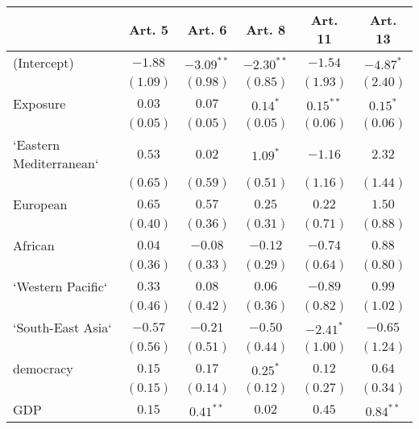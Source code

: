 
\begin{table}[!h]
\begin{center}
\begin{tabular}{l c c c c c }
\toprule
 & Art. 5 & Art. 6 & Art. 8 & Art. 11 & Art. 13 \\
\midrule
(Intercept)             & $-1.88$      & $-3.09^{**}$ & $-2.30^{**}$ & $-1.54$      & $-4.87^{*}$  \\
                        & $(1.09)$     & $(0.98)$     & $(0.85)$     & $(1.93)$     & $(2.40)$     \\
Exposure                & $0.03$       & $0.07$       & $0.14^{*}$   & $0.15^{**}$  & $0.15^{*}$   \\
                        & $(0.05)$     & $(0.05)$     & $(0.05)$     & $(0.06)$     & $(0.06)$     \\
`Eastern Mediterranean` & $0.53$       & $0.02$       & $1.09^{*}$   & $-1.16$      & $2.32$       \\
                        & $(0.65)$     & $(0.59)$     & $(0.51)$     & $(1.16)$     & $(1.44)$     \\
European                & $0.65$       & $0.57$       & $0.25$       & $0.22$       & $1.50$       \\
                        & $(0.40)$     & $(0.36)$     & $(0.31)$     & $(0.71)$     & $(0.88)$     \\
African                 & $0.04$       & $-0.08$      & $-0.12$      & $-0.74$      & $0.88$       \\
                        & $(0.36)$     & $(0.33)$     & $(0.29)$     & $(0.64)$     & $(0.80)$     \\
`Western Pacific`       & $0.33$       & $0.08$       & $0.06$       & $-0.89$      & $0.99$       \\
                        & $(0.46)$     & $(0.42)$     & $(0.36)$     & $(0.82)$     & $(1.02)$     \\
`South-East Asia`       & $-0.57$      & $-0.21$      & $-0.50$      & $-2.41^{*}$  & $-0.65$      \\
                        & $(0.56)$     & $(0.51)$     & $(0.44)$     & $(1.00)$     & $(1.24)$     \\
democracy               & $0.15$       & $0.17$       & $0.25^{*}$   & $0.12$       & $0.64$       \\
                        & $(0.15)$     & $(0.14)$     & $(0.12)$     & $(0.27)$     & $(0.34)$     \\
GDP                     & $0.15$       & $0.41^{**}$  & $0.02$       & $0.45$       & $0.84^{**}$  \\

\end{tabular}
\end{center}
\end{table}
